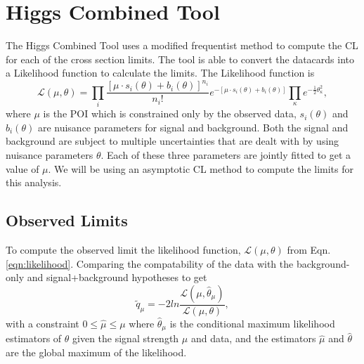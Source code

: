\section{Higgs Combined Tool}\label{sec:HiggsCombined}

The Higgs Combined Tool \cite{noauthor_procedure_2011} uses a modified frequentist method to compute the CL \cite{read_presentation_2002, junk_confidence_1999, read_modified_2000} for each of the cross section limits. The tool is able to convert the datacards into a Likelihood function to calculate the limits. The Likelihood function is 
\begin{equation}\label{eqn:likelihood}
\mathcal{L}(\mu,\theta)=\prod_i \frac{[\mu\cdot s_i(\theta)+b_i(\theta)]^{n_i}}{n_i !}e^{-[\mu\cdot s_i(\theta)+b_i(\theta)]}\prod_\kappa e^{-\frac{1}{2}\theta^2_\kappa},
\end{equation}
where $\mu$ is the POI which is constrained only by the observed data, $s_i(\theta)$ and $b_i(\theta)$ are nuisance parameters for signal and background. Both the signal and background are subject to multiple uncertainties that are dealt with by using nuisance parameters $\theta$. Each of these three parameters are jointly fitted to get a value of $\mu$. We will be using an asymptotic CL method to compute the limits for this analysis. 

\subsection{Observed Limits}\label{sec:ObsLimits}

To compute the observed limit the likelihood function, $\mathcal{L}(\mu,\theta)$ from Eqn. \ref{eqn:likelihood}. Comparing the compatability of the data with the background-only and signal+background hypotheses to get 
\begin{equation}
\widetilde{q}_\mu=-2 ln\frac{\mathcal{L}(\mu,\hat{\theta}_\mu)}{\mathcal{L}(\mu,\theta)},
\end{equation}
with a constraint $0\leq\hat{\mu}\leq\mu$ where $\hat{\theta}_\mu$ is the conditional maximum likelihood estimators of $\theta$ given the signal strength $\mu$ and data, and the estimators $\hat{\mu}$ and $\hat{\theta}$ are the global maximum of the likelihood. 

